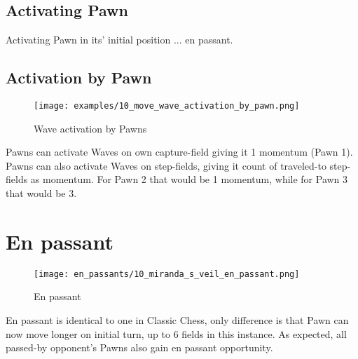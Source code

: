 \clearpage %

\subsection*{Activating Pawn}

Activating Pawn in its' initial position ... en passant.

\clearpage %

\subsection*{Activation by Pawn}

\noindent
\begin{figure}[!h]
\texttt{[image: examples/10\_move\_wave\_activation\_by\_pawn.png]}
\caption{Wave activation by Pawns}
\label{fig:10_move_wave_activation_by_pawn}
\end{figure}

Pawns can activate Waves on own capture-field giving it 1 momentum (Pawn 1).
Pawns can also activate Waves on step-fields, giving it count of traveled-to
step-fields as momentum. For Pawn 2 that would be 1 momentum, while for Pawn 3
that would be 3.

\clearpage %

\section*{En passant}

\noindent
\begin{wrapfigure}{l}{0.4\textwidth}
\centering
\texttt{[image: en\_passants/10\_miranda\_s\_veil\_en\_passant.png]}
\caption{En passant}
\label{fig:10_miranda_s_veil_en_passant}
\end{wrapfigure}
En passant is identical to one in Classic Chess, only difference is that Pawn can now
move longer on initial turn, up to 6 fields in this instance. As expected, all passed-by
opponent's Pawns also gain en passant opportunity.

\clearpage %

